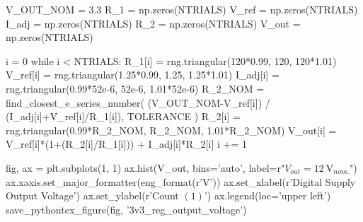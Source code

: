 \documentclass[12pt, titlepage]{/home/air/projects/latex-template/tex-template}
\begin{document}
\begin{pycode}
V_OUT_NOM = 3.3
R_1 = np.zeros(NTRIALS)
V_ref = np.zeros(NTRIALS)
I_adj = np.zeros(NTRIALS)
R_2 = np.zeros(NTRIALS)
V_out = np.zeros(NTRIALS)

i = 0
while i < NTRIALS:
    R_1[i] = rng.triangular(120*0.99, 120, 120*1.01)
    V_ref[i] = rng.triangular(1.25*0.99, 1.25, 1.25*1.01)
    I_adj[i] = rng.triangular(0.99*52e-6, 52e-6, 1.01*52e-6)
    R_2_NOM = find_closest_e_series_number(
        (V_OUT_NOM-V_ref[i]) / (I_adj[i]+V_ref[i]/R_1[i]),
        TOLERANCE
        )
    R_2[i] = rng.triangular(0.99*R_2_NOM, R_2_NOM, 1.01*R_2_NOM)
    V_out[i] = V_ref[i]*(1+(R_2[i]/R_1[i])) + I_adj[i]*R_2[i]
    i += 1

fig, ax = plt.subplots(1, 1)
ax.hist(V_out, bins='auto', label=r"$V_{out}=\SI{12}{\volt}_{nom.}$")
ax.xaxis.set_major_formatter(eng_format(r'\unit{\volt}'))
ax.set_xlabel(r'Digital Supply Output Voltage')
ax.set_ylabel(r'Count $\left(1\right)$')
ax.legend(loc='upper left')
save_pythontex_figure(fig, '3v3_reg_output_voltage')
\end{pycode}
\end{document}
